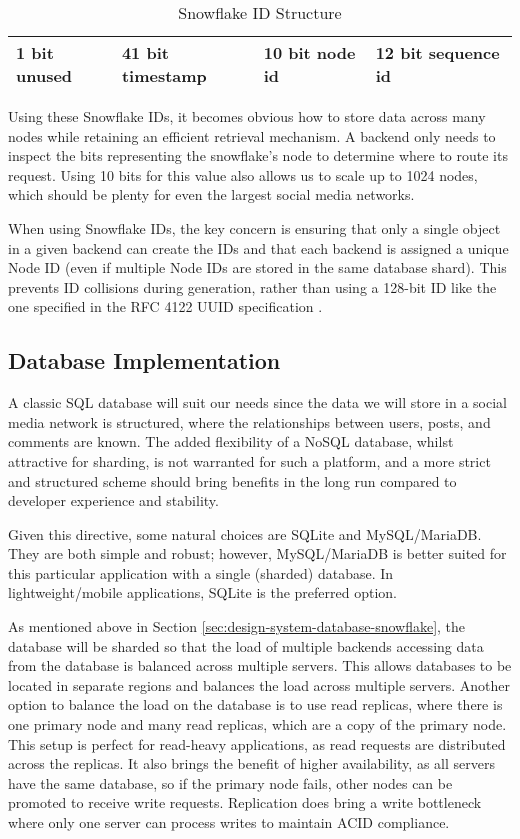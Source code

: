 \begin{table}[htbp]
\centering
\begin{tabular}{|l|l|l|l|}
\hline
1 bit unused & 41 bit timestamp & 10 bit node id & 12 bit sequence id \\ \hline
\end{tabular}
\caption{Snowflake ID Structure}
\label{tab:snowflake}
\end{table}

Using these Snowflake IDs, it becomes obvious how to store data across many nodes while retaining an efficient retrieval mechanism. A backend only needs to inspect the bits representing the snowflake's node to determine where to route its request. Using 10 bits for this value also allows us to scale up to 1024 nodes, which should be plenty for even the largest social media networks.

When using Snowflake IDs, the key concern is ensuring that only a single object in a given backend can create the IDs and that each backend is assigned a unique Node ID (even if multiple Node IDs are stored in the same database shard). 
This prevents ID collisions during generation, rather than using a 128-bit ID like the one specified in the RFC 4122 UUID specification \citep{rfc4122}.

\subsection{Database Implementation}
\label{sec:design-system-database-implementation}
A classic SQL database will suit our needs since the data we will store in a social media network is structured, where the relationships between users, posts, and comments are known.
The added flexibility of a NoSQL database, whilst attractive for sharding, is not warranted for such a platform, and a more strict and structured scheme should bring benefits in the long run compared to developer experience and stability.

Given this directive, some natural choices are SQLite and MySQL/MariaDB. They are both simple and robust; however, MySQL/MariaDB is better suited for this particular application with a single (sharded) database. In lightweight/mobile applications, SQLite is the preferred option.

As mentioned above in Section \ref{sec:design-system-database-snowflake}, the database will be sharded so that the load of multiple backends accessing data from the database is balanced across multiple servers. 
This allows databases to be located in separate regions and balances the load across multiple servers.
Another option to balance the load on the database is to use read replicas, where there is one primary node and many read replicas, which are a copy of the primary node.
This setup is perfect for read-heavy applications, as read requests are distributed across the replicas.
It also brings the benefit of higher availability, as all servers have the same database, so if the primary node fails, other nodes can be promoted to receive write requests.
Replication does bring a write bottleneck where only one server can process writes to maintain ACID compliance. 

